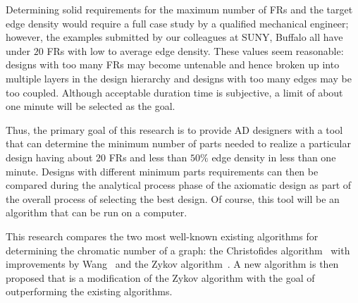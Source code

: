 Determining solid requirements for the maximum number of FRs and the target edge density would require a full case
study by a qualified mechanical engineer; however, the examples submitted by our colleagues at SUNY, Buffalo all
have under \(20\) FRs with low to average edge density.  These values seem reasonable: designs with too many FRs
may become untenable and hence broken up into multiple layers in the design hierarchy and designs with too many
edges may be too coupled.  Although acceptable duration time is subjective, a limit of about one minute will be
selected as the goal.

Thus, the primary goal of this research is to provide AD designers with a tool that can determine the minimum
number of parts needed to realize a particular design having about \(20\) FRs and less than \(50\%\) edge density
in less than one minute.  Designs with different minimum parts requirements can then be compared during the
analytical process phase of the axiomatic design as part of the overall process of selecting the best design.  Of
course, this tool will be an algorithm that can be run on a computer.

This research compares the two most well-known existing algorithms for determining the chromatic number of a graph:
the Christofides algorithm~\cite{christofides} with improvements by Wang~\cite{wang} and the Zykov
algorithm~\cite{corneil}.  A new algorithm is then proposed that is a modification of the Zykov algorithm with the
goal of outperforming the existing algorithms.
